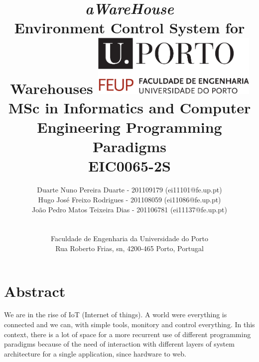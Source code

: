 \documentclass[12pt]{report}
\begin{document}
\setlength{\textwidth}{16cm}
\setlength{\textheight}{22cm}
\title{\huge{\textbf{\textit{aWareHouse}}}\linebreak
\Large\textbf{\\Environment Control System for Warehouses}\linebreak\linebreak\linebreak
\includegraphics[width=8cm]{feup.pdf}\linebreak \linebreak
\large{MSc in Informatics and Computer Engineering} \linebreak
\large{Programming Paradigms \\ EIC0065-2S}\linebreak
}
\author{
Duarte Nuno Pereira Duarte - 201109179 (ei11101@fe.up.pt)\\
Hugo José Freixo Rodrigues - 201108059 (ei11086@fe.up.pt)\\
João Pedro Matos Teixeira Dias - 201106781 (ei11137@fe.up.pt)\\
\\
\\ Faculdade de Engenharia da Universidade do Porto \\ Rua Roberto Frias, s\/n, 4200-465 Porto, Portugal
 \vspace{1cm}}
\maketitle
\thispagestyle{empty}


\newpage
\section*{Abstract}

We are in the rise of IoT (Internet of things). A world were everything is connected and we can, with simple tools, monitory and control everything. In this context, there is a lot of space for a more recurrent use of different programming paradigms because of the need of interaction with different layers of system architecture for a single application, since hardware to web.
\end{document}
